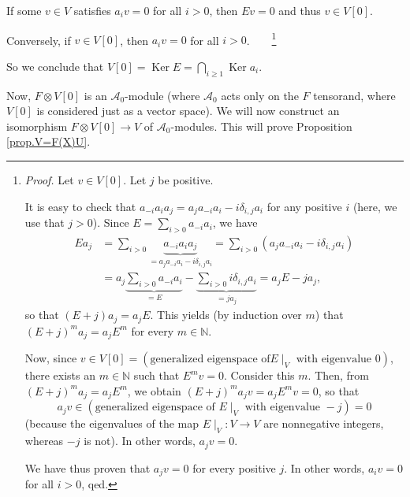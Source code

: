 \documentclass[etingof-lie.tex]{subfiles}
\begin{document}
If some $v\in V$ satisfies $a_{i}v=0$ for all $i>0$, then $Ev=0$ and thus
$v\in V\left[  0\right]  $.

Conversely, if $v\in V\left[  0\right]  $, then $a_{i}v=0$ for all
$i>0$.\ \ \ \ \footnote{\textit{Proof.} Let $v\in V\left[  0\right]  $. Let
$j$ be positive.
\par
It is easy to check that $a_{-i}a_{i}a_{j}=a_{j}a_{-i}a_{i}-i\delta_{i,j}%
a_{i}$ for any positive $i$ (here, we use that $j>0$). Since $E=\sum
\limits_{i>0}a_{-i}a_{i}$, we have%
\begin{align*}
Ea_{j}  &  =\sum\limits_{i>0}\underbrace{a_{-i}a_{i}a_{j}}_{=a_{j}a_{-i}%
a_{i}-i\delta_{i,j}a_{i}}=\sum\limits_{i>0}\left(  a_{j}a_{-i}a_{i}%
-i\delta_{i,j}a_{i}\right) \\
&  =a_{j}\underbrace{\sum\limits_{i>0}a_{-i}a_{i}}_{=E}-\underbrace{\sum
\limits_{i>0}i\delta_{i,j}a_{i}}_{=ja_{j}}=a_{j}E-ja_{j},
\end{align*}
so that $\left(  E+j\right)  a_{j}=a_{j}E$. This yields (by induction over
$m$) that $\left(  E+j\right)  ^{m}a_{j}=a_{j}E^{m}$ for every $m\in
\mathbb{N}$.
\par
Now, since $v\in V\left[  0\right]  =\left(  \text{generalized eigenspace of
}E\mid_{V}\text{ with eigenvalue }0\right)  $, there exists an $m\in
\mathbb{N}$ such that $E^{m}v=0$. Consider this $m$. Then, from $\left(
E+j\right)  ^{m}a_{j}=a_{j}E^{m}$, we obtain $\left(  E+j\right)  ^{m}%
a_{j}v=a_{j}E^{m}v=0$, so that
\[
a_{j}v\in\left(  \text{generalized eigenspace of }E\mid_{V}\text{ with
eigenvalue }-j\right)  =0
\]
(because the eigenvalues of the map $E\mid_{V}:V\rightarrow V$ are nonnegative
integers, whereas $-j$ is not). In other words, $a_{j}v=0$.
\par
We have thus proven that $a_{j}v=0$ for every positive $j$. In other words,
$a_{i}v=0$ for all $i>0$, qed.}

So we conclude that $V\left[  0\right]  =\operatorname*{Ker}E=\bigcap
\limits_{i\geq1}\operatorname*{Ker}a_{i}$.

Now, $F\otimes V\left[  0\right]  $ is an $\mathcal{A}_{0}$-module (where
$\mathcal{A}_{0}$ acts only on the $F$ tensorand, where $V\left[  0\right]  $
is considered just as a vector space). We will now construct an isomorphism
$F\otimes V\left[  0\right]  \rightarrow V$ of $\mathcal{A}_{0}$-modules. This
will prove Proposition \ref{prop.V=F(X)U}.
\end{document}
